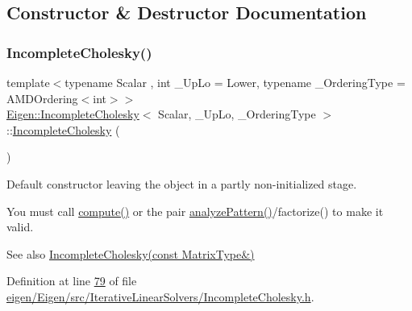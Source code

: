 \subsection{Constructor \& Destructor Documentation}
\mbox{\label{class_eigen_1_1_incomplete_cholesky_adaaa3975b8cf53f910d6a3344af92379}} 
\subsubsection{\texorpdfstring{Incomplete\+Cholesky()}{IncompleteCholesky()}\hspace{0.1cm}{\footnotesize\ttfamily [1/4]}}
{\footnotesize\ttfamily template$<$typename Scalar , int \+\_\+\+Up\+Lo = Lower, typename \+\_\+\+Ordering\+Type  = A\+M\+D\+Ordering$<$int$>$$>$ \\
\hyperlink{class_eigen_1_1_incomplete_cholesky}{Eigen\+::\+Incomplete\+Cholesky}$<$ Scalar, \+\_\+\+Up\+Lo, \+\_\+\+Ordering\+Type $>$\+::\hyperlink{class_eigen_1_1_incomplete_cholesky}{Incomplete\+Cholesky} (\begin{DoxyParamCaption}{ }\end{DoxyParamCaption})\hspace{0.3cm}{\ttfamily [inline]}}

Default constructor leaving the object in a partly non-\/initialized stage.

You must call \hyperlink{class_eigen_1_1_incomplete_cholesky_a7966bedeebbeaa7a8fe4dd1da3797a0b}{compute()} or the pair \hyperlink{class_eigen_1_1_incomplete_cholesky_a702560ecdddef77dc51d20ab22bd974e}{analyze\+Pattern()}/factorize() to make it valid.

\begin{DoxySeeAlso}{See also}
\hyperlink{class_eigen_1_1_incomplete_cholesky_a757499fc814988a5b112b1f34d0295e1}{Incomplete\+Cholesky(const Matrix\+Type\&)} 
\end{DoxySeeAlso}


Definition at line \hyperlink{eigen_2_eigen_2src_2_iterative_linear_solvers_2_incomplete_cholesky_8h_source_l00079}{79} of file \hyperlink{eigen_2_eigen_2src_2_iterative_linear_solvers_2_incomplete_cholesky_8h_source}{eigen/\+Eigen/src/\+Iterative\+Linear\+Solvers/\+Incomplete\+Cholesky.\+h}.

